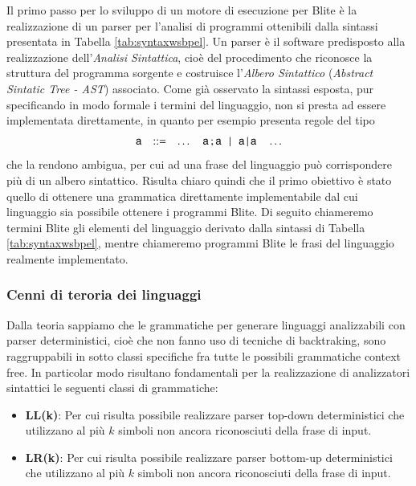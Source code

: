 Il primo passo per lo sviluppo di un motore di esecuzione per Blite è la
realizzazione di un parser per l'analisi di programmi ottenibili dalla sintassi
presentata in Tabella \ref{tab:syntaxwsbpel}. Un parser è il software predisposto
alla realizzazione dell'\emph{Analisi Sintattica}, cioè del procedimento che
riconosce la struttura del programma sorgente e costruisce l'\emph{Albero
Sintattico} (\emph{Abstract Sintatic Tree - AST}) associato. Come già osservato
la sintassi esposta, pur specificando in modo formale i termini del linguaggio,
non si presta ad essere implementata direttamente, in quanto per esempio
presenta regole del tipo 
$$
\begin{array}{rcl}
{\sf a} & ::= & \ldots \quad
{\sf a} \, ;{\sf a}  \!\!\quad | \quad\!\! {\sf a} \,|\, {\sf a} \quad \ldots 
\end{array}
$$
che la rendono ambigua, per cui ad una frase del linguaggio può corrispondere
più di un albero sintattico. Risulta chiaro quindi che il primo obiettivo è
stato quello di ottenere una grammatica direttamente implementabile 
dal cui linguaggio sia possibile ottenere i programmi Blite. Di seguito
chiameremo termini Blite gli elementi del linguaggio derivato dalla sintassi di
Tabella \ref{tab:syntaxwsbpel}, mentre chiameremo programmi Blite le frasi
del linguaggio realmente implementato.
\\

\subsubsection{Cenni di teroria dei linguaggi}

Dalla teoria sappiamo che le grammatiche per generare linguaggi
analizzabili con parser deterministici, cioè che non fanno uso di tecniche di
backtraking, sono raggruppabili in sotto classi specifiche fra tutte le
possibili grammatiche context free. In particolar modo risultano fondamentali
per la realizzazione di analizzatori sintattici le seguenti classi di
grammatiche:
\begin{itemize}
  \item \textbf{LL(k)}: Per cui risulta possibile realizzare parser top-down
  deterministici che utilizzano al più $k$ simboli non ancora riconosciuti
  della frase di input.
  \item \textbf{LR(k)}: Per cui risulta possibile realizzare parser bottom-up
  deterministici che utilizzano al più $k$ simboli non ancora riconosciuti
  della frase di input.
\end{itemize}

